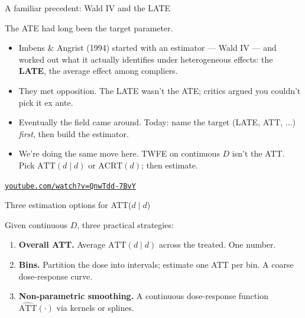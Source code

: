 \documentclass[aspectratio=169,12pt,t]{beamer}
\begin{document}
\begin{frame}{A familiar precedent: Wald IV and the LATE}
\vspace{0.1em}

The ATE had long been the target parameter.

\vspace{0.4em}

\begin{itemize}\setlength\itemsep{3pt}\footnotesize
  \item Imbens \& Angrist (1994) started with an estimator --- Wald IV --- and worked out what it actually identifies under heterogeneous effects: the \textbf{LATE}, the average effect among compliers.
  \item They met opposition. The LATE wasn't the ATE; critics argued you couldn't pick it ex ante.
  \item Eventually the field came around. Today: name the target (LATE, ATT, $\ldots$) \textit{first}, then build the estimator.
  \item We're doing the same move here. TWFE on continuous $D$ isn't the ATT. \;Pick $\text{ATT}(d \mid d)$ or $\text{ACRT}(d)$; then estimate.
\end{itemize}

\vspace{0.3em}
\begin{center}
{\footnotesize\color{warmgray}
\href{https://www.youtube.com/watch?v=QnwTdd-7BvY}%
{\texttt{youtube.com/watch?v=QnwTdd-7BvY}}}
\end{center}
\end{frame}

\begin{frame}{Three estimation options for ATT($d \mid d$)}
\vspace{0.2cm}

Given continuous $D$, three practical strategies:

\vspace{0.4cm}

\begin{enumerate}\setlength\itemsep{5pt}
  \item \textbf{Overall ATT.} \;Average $\text{ATT}(d \mid d)$ across the treated. \;One number.
  \item \textbf{Bins.} \;Partition the dose into intervals; estimate one ATT per bin. \;A coarse dose-response curve.
  \item \textbf{Non-parametric smoothing.} \;A continuous dose-response function $\widehat{\text{ATT}}(\cdot)$ via kernels or splines.
\end{enumerate}

\vspace{0.4em}
\end{frame}
\end{document}
